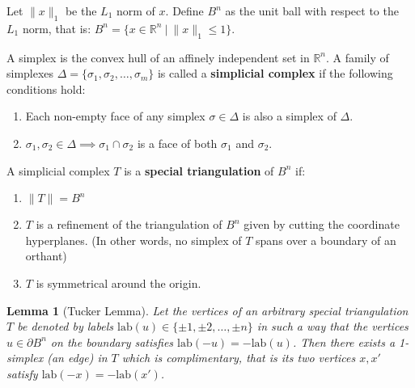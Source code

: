 \documentclass[a4paper,11pt]{report}
\newtheorem{lemma}[theorem]{Lemma}
\theoremstyle{definition}
\newcommand{\RR}{\mathbb R}
\newcommand{\1}[1]{\mathds{1}_{[#1]}}
\begin{document}
Let $\|x\|_1$ be the $L_1$ norm of $x$. Define $B^n$ as the unit ball with respect to the $L_1$ norm, 
that is: $B^n = \{x\in \RR^n \ \big | \ \|x\|_1 \leq 1 \}$.

A simplex is the convex hull of an affinely independent set in $\RR^n$. A family of simplexes $\Delta = \{\sigma_1,\sigma_2, \dots, \sigma_m\}$ is called a \textbf{simplicial complex} if the following conditions hold:
\begin{enumerate}
    \item Each non-empty face of any simplex $\sigma \in \Delta$ is also a simplex of $\Delta$.
    \item $\sigma_1, \sigma_2 \in \Delta \implies \sigma_1 \cap \sigma_2$ is a face of both $\sigma_1$ and $\sigma_2$.
\end{enumerate}
A simplicial complex $T$ is a \textbf{special triangulation} of $B^n$ if:
\begin{enumerate}
    \item $\|T\| = B^n$
    \item $T$ is a refinement of the triangulation of $B^n$ given by cutting the coordinate hyperplanes. (In other words, no simplex of $T$ spans over a boundary of an orthant)
    \item $T$ is symmetrical around the origin.
\end{enumerate}

\begin{lemma}[Tucker Lemma]
    Let the vertices of an arbitrary special triangulation $T$ be denoted by labels $\text{lab} (u) \in \{\pm1, \pm2,\dots ,\pm n\}$
    in such a way that the vertices $u \in \partial B^n$ on the boundary satisfies $\text{lab} (-u) = -\text{lab} (u)$. Then there exists a 1-simplex (an edge) in $T$ which is complimentary, that is its two vertices $x,x'$ satisfy $\text{lab} (-x) = -\text{lab} (x')$.
\end{lemma}

\clearpage
{}
{}
\printindex
\end{document}
